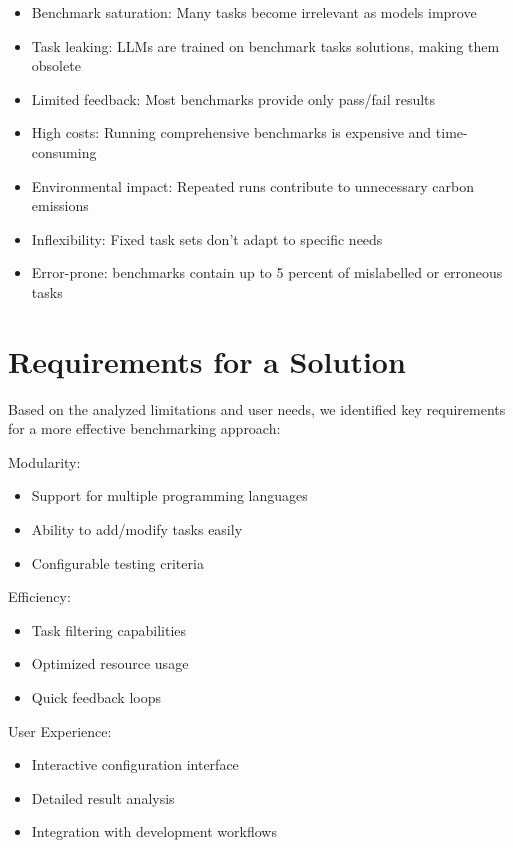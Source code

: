 \begin{itemize}
    \item Benchmark saturation: Many tasks become irrelevant as models improve \cite{vendrow2025largelanguagemodelbenchmarks}
    \item Task leaking: LLMs are trained on benchmark tasks solutions, making them obsolete \cite{vendrow2025largelanguagemodelbenchmarks}
    \item Limited feedback: Most benchmarks provide only pass/fail results
    \item High costs: Running comprehensive benchmarks is expensive and time-consuming
    \item Environmental impact: Repeated runs contribute to unnecessary carbon emissions
    \item Inflexibility: Fixed task sets don't adapt to specific needs
    \item Error-prone: benchmarks contain up to 5 percent of mislabelled or erroneous tasks \cite{vendrow2025largelanguagemodelbenchmarks}
\end{itemize}



\section{Requirements for a Solution}

Based on the analyzed limitations and user needs, we identified key requirements for a more effective benchmarking approach:

Modularity:
\begin{itemize}
    \item Support for multiple programming languages
    \item Ability to add/modify tasks easily
    \item Configurable testing criteria
\end{itemize}

Efficiency:
\begin{itemize}
    \item Task filtering capabilities
    \item Optimized resource usage
    \item Quick feedback loops
\end{itemize}

User Experience:
\begin{itemize}
    \item Interactive configuration interface
    \item Detailed result analysis
    \item Integration with development workflows
\end{itemize}

